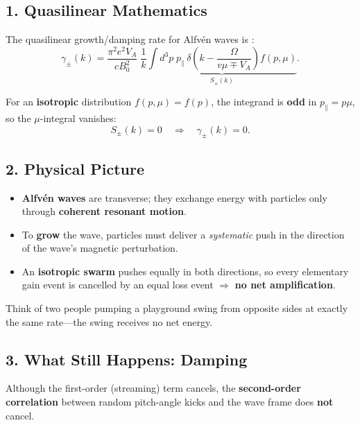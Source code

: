 \subsection*{1. Quasilinear Mathematics}

The quasilinear growth/damping rate for Alfvén waves is \cite{Jokipii1966, Skilling1975}:
\begin{equation}
\gamma_\pm(k) =
\frac{\pi^2 e^2 V_A}{c B_0^2}\;
\frac{1}{k}
\underbrace{\int d^3p\; p_\parallel\,
\delta\!\left(k - \frac{\Omega}{v\mu \mp V_A}\right)
f(p, \mu)}_{S_\pm(k)}.
\end{equation}

For an \textbf{isotropic} distribution $f(p,\mu) = f(p)$, the integrand is \textbf{odd} in $p_\parallel = p\mu$, so the $\mu$-integral vanishes:
\begin{equation}
S_\pm(k) = 0 \quad \Longrightarrow \quad \boxed{\gamma_\pm(k) = 0}.
\end{equation}

\subsection*{2. Physical Picture}

\begin{itemize}
    \item \textbf{Alfvén waves} are transverse; they exchange energy with particles only through \textbf{coherent resonant motion}.
    \item To \textbf{grow} the wave, particles must deliver a \textit{systematic} push in the direction of the wave’s magnetic perturbation.
    \item An \textbf{isotropic swarm} pushes equally in both directions, so every elementary gain event is cancelled by an equal loss event $\Rightarrow$ \textbf{no net amplification}.
\end{itemize}

Think of two people pumping a playground swing from opposite sides at exactly the same rate—the swing receives no net energy.

\subsection*{3. What Still Happens: Damping}

Although the first-order (streaming) term cancels, the \textbf{second-order correlation} between random pitch-angle kicks and the wave frame does \textbf{not} cancel.

